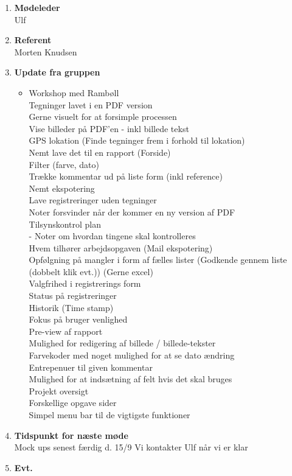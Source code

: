 	\begin{enumerate}
		\itemsep 0.3em 
		\item \textbf{Mødeleder}\\
			Ulf
		\item \textbf{Referent}\\
			Morten Knudsen

		\item \textbf{Update fra gruppen}
			\begin{itemize}[-]
			\item Workshop med Rambøll\\
				Tegninger lavet i en PDF version \\
				Gerne visuelt for at forsimple processen \\
				Vise billeder på PDF'en - inkl billede tekst \\
				GPS lokation (Finde tegninger frem i forhold til lokation) \\
				Nemt lave det til en rapport (Forside) \\
				Filter (farve, dato) \\
				Trække kommentar ud på liste form (inkl reference) \\
				Nemt ekspotering \\
				Lave registreringer uden tegninger \\
				Noter forsvinder når der kommer en ny version af PDF \\
				Tilsynskontrol plan \\
				- Noter om hvordan tingene skal kontrolleres \\
				Hvem tilhører arbejdsopgaven (Mail ekspotering) \\
				Opfølgning på mangler i form af fælles lister (Godkende gennem liste (dobbelt klik evt.)) (Gerne excel) \\
				Valgfrihed i registrerings form \\
				Status på registreringer \\
				Historik (Time stamp) \\
				Fokus på bruger venlighed \\
				Pre-view af rapport \\
				Mulighed for redigering af billede / billede-tekster \\ 
				Farvekoder med noget mulighed for at se dato ændring\\
				Entrepenuer til given kommentar \\
				Mulighed for at indsætning af felt hvis det skal bruges \\
				
				
				\newpage
				Projekt oversigt \\				
				Forskellige opgave sider \\
				Simpel menu bar til de vigtigste funktioner \\
								
				
		\end{itemize}	
		\item \textbf{Tidspunkt for næste møde}\\
			Mock ups senest færdig d. 15/9
			Vi kontakter Ulf når vi er klar
		\item \textbf{Evt.}
	\end{enumerate}
